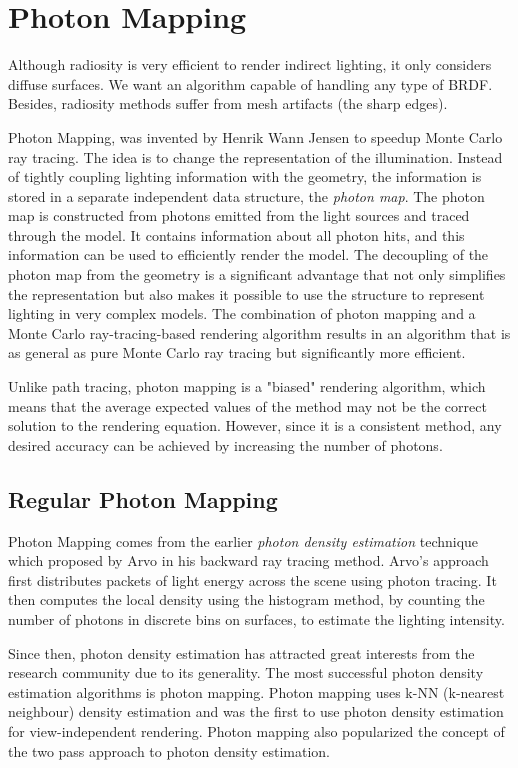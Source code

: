 \chapter{Photon Mapping}
Although radiosity is very efficient to render indirect lighting, it only considers diffuse surfaces. We want an algorithm capable of handling any type of BRDF. Besides, radiosity methods suffer from mesh artifacts (the sharp edges).

Photon Mapping, was invented by Henrik Wann Jensen\cite{a:GlobalIlluminationusingPhotonMaps} to speedup Monte Carlo ray tracing. The idea is to change the representation of the illumination. Instead of tightly coupling lighting information with the geometry, the information is stored in a separate independent data structure, the \textit{photon map}. The photon map is constructed from photons emitted from the light sources and traced through the model. It contains information about all photon hits, and this information can be used to efficiently render the model. The decoupling of the photon map from the geometry is a significant advantage that not only simplifies the representation but also makes it possible to use the structure to represent lighting in very complex models. The combination of photon mapping and a Monte Carlo ray-tracing-based rendering algorithm results in an algorithm that is as general as pure Monte Carlo ray tracing but significantly more efficient.

Unlike path tracing, photon mapping is a "biased" rendering algorithm, which means that the average expected values of the method may not be the correct solution to the rendering equation. However, since it is a consistent method, any desired accuracy can be achieved by increasing the number of photons.




\section{Regular Photon Mapping}
Photon Mapping comes from the earlier \textit{photon density estimation} technique which proposed by Arvo in his backward ray tracing method\cite[-3mm]{a:Backwardraytracing}. Arvo's approach first distributes packets of light energy across the scene using photon tracing. It then computes the local density using the histogram method, by counting the number of photons in discrete bins on surfaces, to estimate the lighting intensity. 

Since then, photon density estimation has attracted great interests from the research community due to its generality. The most successful photon density estimation algorithms is photon mapping\cite{a:GlobalIlluminationusingPhotonMaps}. Photon mapping uses k-NN (k-nearest neighbour) density estimation and was the first to use photon density estimation for view-independent rendering. Photon mapping also popularized the concept of the two pass approach to photon density estimation.



